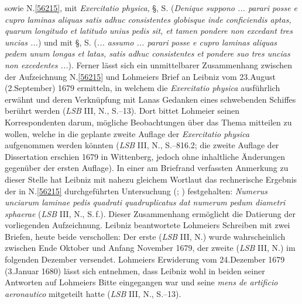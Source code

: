 sowie N.\;\ref{56215},  mit \textit{Exercitatio physica},\cite{01422} §, S. (\textit{Denique suppono ... parari posse e cupro laminas aliquas satis adhuc consistentes globisque inde conficien}\lbrack\textit{d}\rbrack\textit{is aptas, quarum longitudo et latitudo unius pedis sit, et tamen pondere non excedant tres uncias ...})
und mit §, S. (\textit{... assumo ... parari posse e cupro laminas aliquas pedem unum longas et latas, satis adhuc consistentes et pondere suo tres uncias non excedentes ...}).
Ferner lässt sich ein unmittelbarer Zusammenhang zwischen der Aufzeichnung N.\;\ref{56215} und Lohmeiers Brief an Leibniz vom 23.\;August (2.\;September) 1679 ermitteln, in welchem die \textit{Exercitatio physica}\cite{01422} ausführlich erwähnt und deren Verknüpfung mit Lanas Gedanken eines schwebenden Schiffes berührt werden (\textit{LSB} III, N., S.--13).\cite{01425}
Dort bittet Lohmeier seinen Korrespondenten darum, mögliche Beobachtungen über das Thema mitteilen zu wollen, welche in die geplante zweite Auflage der \textit{Exercitatio physica}\cite{01422} aufgenommen werden könnten (\textit{LSB} III, N., S.--816.2; die zweite Auflage der Dissertation erschien 1679 in Wittenberg, jedoch ohne inhaltliche Änderungen gegenüber der ersten Auflage).
In einer am Briefrand verfassten Anmerkung zu dieser Stelle hat Leibniz mit nahezu gleichem Wortlaut das rechnerische Ergebnis der in N.\;\ref{56215} durchgeführten Untersuchung (; ) festgehalten: \textit{Numerus unciarum laminae pedis quadrati quadruplicatus dat numerum pedum diametri sphaerae} (\textit{LSB} III, N., S.\,f.).
Dieser Zusammenhang ermöglicht die Datierung der vorliegenden Aufzeichnung.
\pend%
\pstart%
Leibniz beantwortete Lohmeiers Schreiben mit zwei Briefen, heute beide verschollen: Der erste (\textit{LSB} III, N.)\cite{01426} wurde wahrscheinlich zwischen Ende Oktober und Anfang November 1679, der zweite (\textit{LSB} III, N.)\cite{01427} im folgenden Dezember versendet.
Lohmeiers Erwiderung vom 24.\;Dezember 1679 (3.\;Januar 1680) lässt sich entnehmen, dass Leibniz wohl in beiden seiner Antworten auf Lohmeiers Bitte eingegangen war und seine \textit{mens de artificio aeronautico} mitgeteilt hatte (\textit{LSB} III, N., S.--13).\cite{01428}
